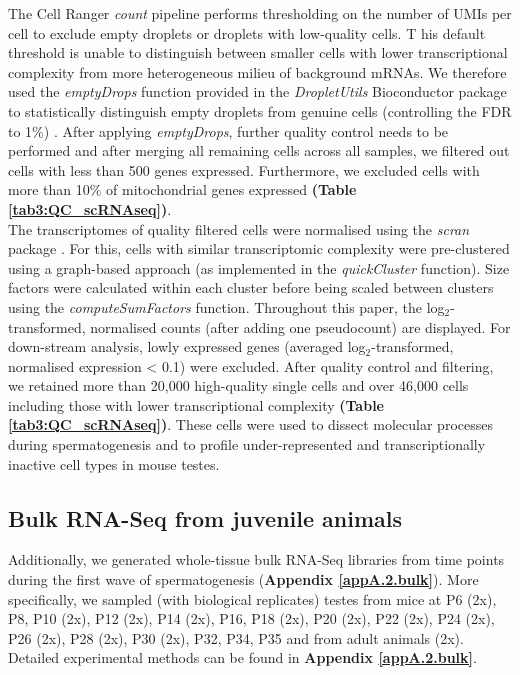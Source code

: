 The Cell Ranger \emph{count} pipeline performs thresholding on the number of UMIs per cell to exclude empty droplets or droplets with low-quality cells. T
his default threshold is unable to distinguish between smaller cells with lower transcriptional complexity from more heterogeneous milieu of background mRNAs. 
We therefore used the \emph{emptyDrops} function provided in the \emph{DropletUtils} Bioconductor package to statistically distinguish empty droplets from genuine cells (controlling the FDR to 1\%) \citep{Lun2018}. 
After applying \emph{emptyDrops}, further quality control needs to be performed and after merging all remaining cells across all samples, we filtered out cells with less than 500 genes expressed. 
Furthermore, we excluded cells with more than 10\% of mitochondrial genes expressed \textbf{(Table \ref{tab3:QC_scRNAseq})}.\\
 
The transcriptomes of quality filtered cells were normalised using the \emph{scran} package \citep{Lun2016pooling}. 
For this, cells with similar transcriptomic complexity were pre-clustered using a graph-based approach (as implemented in the \emph{quickCluster} function). 
Size factors were calculated within each cluster before being scaled between clusters using the \emph{computeSumFactors} function. 
Throughout this paper, the log$_2$-transformed, normalised counts (after adding one pseudocount) are displayed. 
For down-stream analysis, lowly expressed genes (averaged log$_2$-transformed, normalised expression < 0.1) were excluded. 
After quality control and filtering, we retained more than 20,000 high-quality single cells and over 46,000 cells including those with lower transcriptional complexity \textbf{(Table \ref{tab3:QC_scRNAseq})}. 
These cells were used to dissect molecular processes during spermatogenesis and to profile under-represented and transcriptionally inactive cell types in mouse testes. 

\subsection{Bulk RNA-Seq from juvenile animals}

Additionally, we generated whole-tissue bulk RNA-Seq libraries from time points during the first wave of spermatogenesis (\textbf{Appendix \ref{appA.2.bulk}}). 
More specifically, we sampled (with biological replicates) testes from mice at \gls{P}6 (2x), P8, P10 (2x), P12 (2x), P14 (2x), P16, P18 (2x), P20 (2x), P22 (2x), P24 (2x), P26 (2x), P28 (2x), P30 (2x), P32, P34, P35 and from adult animals (2x). 
Detailed experimental methods can be found in \textbf{Appendix \ref{appA.2.bulk}}. 
\\

